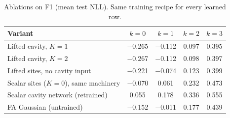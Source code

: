 \begin{table}[t]
\centering\small
\caption{\label{tab:ablation}Ablations on F1 (mean test NLL). Same training recipe for every learned row.}
\begin{tabular}{lcccc}
\toprule
Variant & $k{=}0$ & $k{=}1$ & $k{=}2$ & $k{=}3$\\
\midrule
Lifted cavity, $K=1$ & $-$0.265 & $-$0.112 & 0.097 & 0.395\\
Lifted cavity, $K=2$ & $-$0.267 & $-$0.112 & 0.098 & 0.397\\
Lifted sites, no cavity input & $-$0.221 & $-$0.074 & 0.123 & 0.399\\
Scalar sites ($K=0$), same machinery & $-$0.070 & 0.061 & 0.232 & 0.473\\
Scalar cavity network (retrained) & 0.055 & 0.178 & 0.336 & 0.555\\
FA Gaussian (untrained) & $-$0.152 & $-$0.011 & 0.177 & 0.439\\
\bottomrule
\end{tabular}
\end{table}
